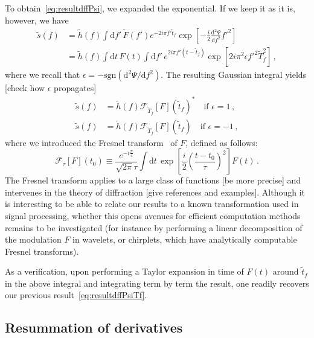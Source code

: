 \documentclass[aps,showpacs,%
prd,superscriptaddress,nofootinbib]{revtex4}
\newcommand{\be}{\begin{equation}}
\newcommand{\ee}{\end{equation}}
\newcommand\ud{{\mathrm{d}}}
\newcommand\calF{{\mathcal{F}}}
\newcommand{\tf}{\tilde{t}_{f}}
\newcommand{\Tf}{\tilde{T}_{f}}
\begin{document}
To obtain~\eqref{eq:resultdffPsi}, we expanded the exponential. If we keep it as it is, however, we have
%
\begin{subequations}
\begin{align}
	\tilde{s}(f) &= \tilde{h}(f) \int\ud f'\, \tilde{F}(f') e^{-2i\pi f'\tf} \exp\left[ -\frac{i}{2} \frac{\ud^{2} \Psi}{\ud f^{2}} {f'}^{2} \right] \, \\
	&= \tilde{h}(f) \int \ud t\, F(t) \int\ud f'\, e^{2i\pi f' (t-\tf)} \exp\left[ 2i\pi^{2} \epsilon{f'}^{2} \Tf^{2} \right] \,,
\end{align}
\end{subequations}
%
where we recall that $\epsilon = -\mathrm{sgn}(\ud ^{2} \Psi/\ud f^{2})$. The resulting Gaussian integral yields [check how $\epsilon$ propagates]
%
\begin{subequations}
\begin{align}\label{eq:resultFresnel}
	\tilde{s}(f) &= \tilde{h}(f) \calF_{\Tf}[F](\tf)^{*} \quad \text{if } \epsilon = 1 \,,\\
	\tilde{s}(f) &= \tilde{h}(f) \calF_{\Tf}[F](\tf) \quad \text{if } \epsilon = -1 \,,
\end{align}
\end{subequations}
%
where we introduced the Fresnel transform~\cite{} of $F$, defined as follows:
%
\be\label{eq:defFresnel}
	\calF_{\tau}[F](t_{0}) \equiv \frac{e^{-i\frac{\pi}{4}}}{\sqrt{2\pi} \tau} \int \ud t \, \exp\left[ \frac{i}{2} \left( \frac{t-t_{0}}{\tau} \right)^{2}\right] F(t) \,.
\ee
%
The Fresnel transform applies to a large class of functions [be more precise] and intervenes in the theory of diffraction [give references and examples]. Although it is interesting to be able to relate our results to a known transformation used in signal processing, whether this opens avenues for efficient computation methods remains to be investigated (for instance by performing a linear decomposition of the modulation $F$ in wavelets, or chirplets, which have analytically computable Fresnel transforms). 

As a verification, upon performing a Taylor expansion in time of $F(t)$ around $\tf$ in the above integral and integrating  term by term the result, one readily recovers our previous result~\eqref{eq:resultdffPsiTf}.


\subsection{Resummation of derivatives}
\label{subsec:resummation}
\end{document}
